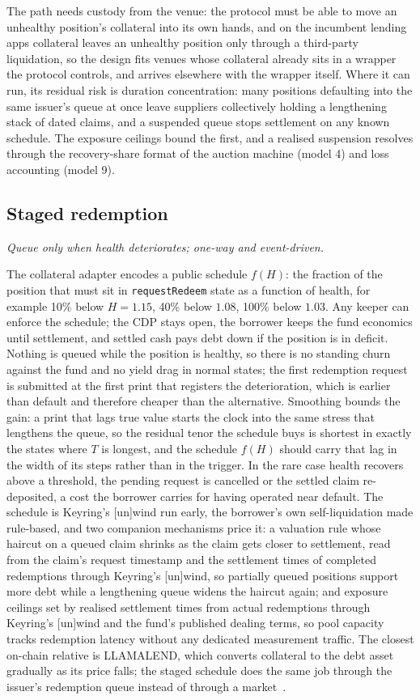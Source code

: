 \documentclass[11pt,a4paper]{article}
\newcommand{\model}[2]{\subsection{#1}\noindent\textit{#2}\medskip}
\begin{document}
The path needs custody from the venue: the protocol must be able to move an unhealthy position's collateral into its own hands, and on the incumbent lending apps collateral leaves an unhealthy position only through a third-party liquidation, so the design fits venues whose collateral already sits in a wrapper the protocol controls, and arrives elsewhere with the wrapper itself. Where it can run, its residual risk is duration concentration: many positions defaulting into the same issuer's queue at once leave suppliers collectively holding a lengthening stack of dated claims, and a suspended queue stops settlement on any known schedule. The exposure ceilings bound the first, and a realised suspension resolves through the recovery-share format of the auction machine (model 4) and loss accounting (model 9).

\model{Staged redemption}{Queue only when health deteriorates; one-way and event-driven.}

The collateral adapter encodes a public schedule $f(H)$: the fraction of the position that must sit in \texttt{requestRedeem} state as a function of health, for example 10\% below $H = 1.15$, 40\% below $1.08$, 100\% below $1.03$. Any keeper can enforce the schedule; the CDP stays open, the borrower keeps the fund economics until settlement, and settled cash pays debt down if the position is in deficit. Nothing is queued while the position is healthy, so there is no standing churn against the fund and no yield drag in normal states; the first redemption request is submitted at the first print that registers the deterioration, which is earlier than default and therefore cheaper than the alternative. Smoothing bounds the gain: a print that lags true value starts the clock into the same stress that lengthens the queue, so the residual tenor the schedule buys is shortest in exactly the states where $T$ is longest, and the schedule $f(H)$ should carry that lag in the width of its steps rather than in the trigger. In the rare case health recovers above a threshold, the pending request is cancelled or the settled claim re-deposited, a cost the borrower carries for having operated near default. The schedule is Keyring's [un]wind run early, the borrower's own self-liquidation made rule-based, and two companion mechanisms price it: a valuation rule whose haircut on a queued claim shrinks as the claim gets closer to settlement, read from the claim's request timestamp and the settlement times of completed redemptions through Keyring's [un]wind, so partially queued positions support more debt while a lengthening queue widens the haircut again; and exposure ceilings set by realised settlement times from actual redemptions through Keyring's [un]wind and the fund's published dealing terms, so pool capacity tracks redemption latency without any dedicated measurement traffic. The closest on-chain relative is LLAMALEND, which converts collateral to the debt asset gradually as its price falls; the staged schedule does the same job through the issuer's redemption queue instead of through a market~\cite{llamalend}.
\end{document}
